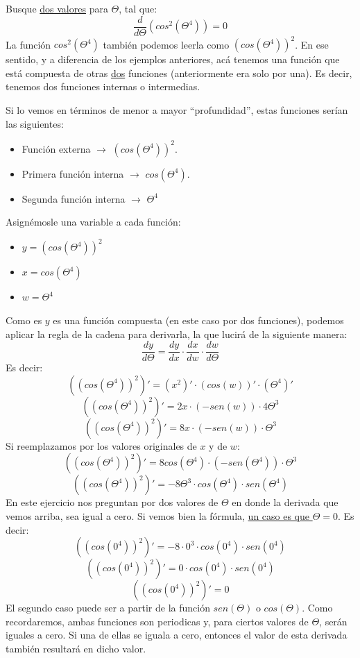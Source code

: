 \documentclass[12pt]{article}
\begin{document}
Busque \underline{dos valores} para $\Theta$, tal que:
\[\frac{d}{d \Theta} (cos^{2}(\Theta^{4})) = 0\]
La función $cos^{2}(\Theta^{4})$ también podemos leerla como $(cos(\Theta^{4}))^{2}$. En ese sentido, y a diferencia de los ejemplos anteriores, acá tenemos una función que está compuesta de otras \underline{dos} funciones (anteriormente era solo por una). Es decir, tenemos dos funciones internas o intermedias.

Si lo vemos en términos de menor a mayor ``profundidad'', estas funciones serían las siguientes:

\begin{itemize}
\item Función externa $\rightarrow$ $(cos(\Theta^{4}))^{2}$.
\item Primera función interna $\rightarrow$ $cos(\Theta^{4})$.
\item Segunda función interna $\rightarrow$ $\Theta^{4}$
\end{itemize}

Asignémosle una variable a cada función:

\begin{itemize}
\item $y = (cos(\Theta^{4}))^{2}$
\item $x = cos(\Theta^{4})$
\item $w = \Theta^{4}$
\end{itemize}

Como es $y$ es una función compuesta (en este caso por dos funciones), podemos aplicar la regla de la cadena para derivarla, la que lucirá de la siguiente manera:
\[\frac{dy}{d \Theta} = \frac{dy}{dx} \cdot \frac{dx}{dw} \cdot \frac{dw}{d \Theta}\]
Es decir:
\[((cos(\Theta^{4}))^{2})' = (x^{2})' \cdot (cos(w))' \cdot (\Theta^{4})'\]
\[((cos(\Theta^{4}))^{2})' = 2x \cdot (-sen(w)) \cdot 4\Theta^{3}\]
\[((cos(\Theta^{4}))^{2})' = 8x \cdot (-sen(w)) \cdot \Theta^{3}\]
Si reemplazamos por los valores originales de $x$ y de $w$:
\[((cos(\Theta^{4}))^{2})' = 8cos(\Theta^{4}) \cdot (-sen(\Theta^{4})) \cdot \Theta^{3}\]
\[((cos(\Theta^{4}))^{2})' = -8\Theta^{3} \cdot cos(\Theta^{4}) \cdot sen(\Theta^{4})\]
En este ejercicio nos preguntan por dos valores de $\Theta$ en donde la derivada que vemos arriba, sea igual a cero. Si vemos bien la fórmula, \underline{un caso es que $\Theta = 0$}. Es decir:
\[((cos(0^{4}))^{2})' = -8 \cdot 0^{3} \cdot cos(0^{4}) \cdot sen(0^{4})\]
\[((cos(0^{4}))^{2})' = 0 \cdot cos(0^{4}) \cdot sen(0^{4})\]
\[((cos(0^{4}))^{2})' = 0\]
El segundo caso puede ser a partir de la función $sen(\Theta)$ o $cos(\Theta)$. Como recordaremos, ambas funciones son periodicas y, para ciertos valores de $\Theta$, serán iguales a cero. Si una de ellas se iguala a cero, entonces el valor de esta derivada también resultará en dicho valor.
\end{document}
